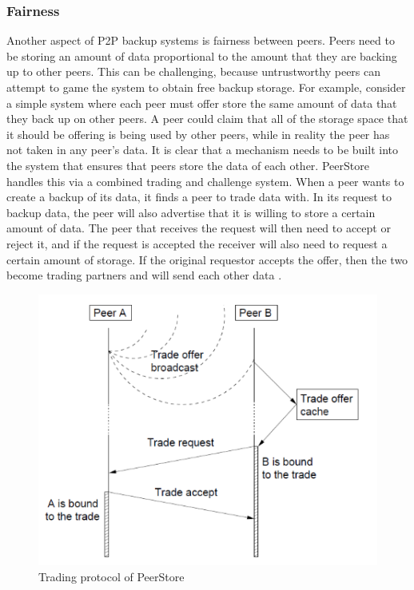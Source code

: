 \documentclass[a4paper]{article}
\begin{document}
\subsubsection{Fairness}
Another aspect of P2P backup systems is fairness between peers. Peers need to be storing an amount of data proportional to the amount that they are backing up to other peers. This can be challenging, because untrustworthy peers can attempt to game the system to obtain free backup storage. For example, consider a simple system where each peer must offer store the same amount of data that they back up on other peers. A peer could claim that all of the storage space that it should be offering is being used by other peers, while in reality the peer has not taken in any peer's data. It is clear that a mechanism needs to be built into the system that ensures that peers store the data of each other. PeerStore handles this via a combined trading and challenge system. When a peer wants to create a backup of its data, it finds a peer to trade data with. In its request to backup data, the peer will also advertise that it is willing to store a certain amount of data. The peer that receives the request will then need to accept or reject it, and if the request is accepted the receiver will also need to request a certain amount of storage. If the original requestor accepts the offer, then the two become trading partners and will send each other data \cite{PeerStore}.

\begin{figure}
  \centering
  \includegraphics[scale=0.75]{PeerStoreTrading}
  \caption{Trading protocol of PeerStore}
\end{figure}
\end{document}
